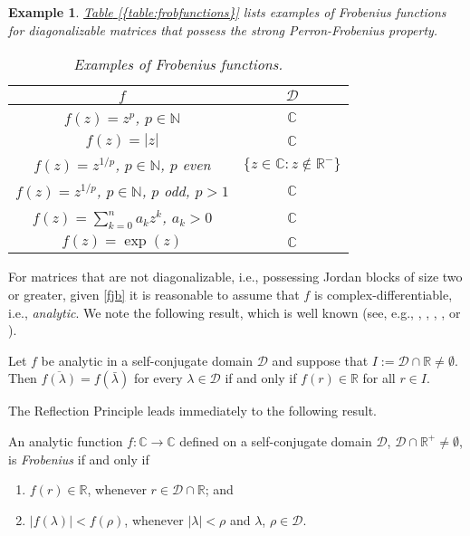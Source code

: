 \documentclass[10pt,twoside,leqno]{siamltex}
\newtheorem{ex}[theorem]{Example}
\begin{document}
\begin{ex}
{\rm {\hyperref[{table:frobfunctions}]{{\rm {Table} \ref*{{table:frobfunctions}}}}} lists examples of Frobenius functions for diagonalizable matrices that possess the strong Perron-Frobenius property. 
\begin{table}[H]
\begin{center}
\begin{tabular}{c|c}
$f$ & $\mathcal{D}$										\\
\hline
$f(z) = z^p$, $p \in {\mathbb{{N}}}$ & ${\mathbb{{C}}}$ 							\\
$f(z) = |z|$ & ${\mathbb{{C}}}$										\\
$f(z) = z^{1/p}$, $p \in {\mathbb{{N}}}$, $p$ even & $\{z \in {\mathbb{{C}}}: z \not \in {\mathbb{{R}}}^- \}$  \\
$f(z) = z^{1/p}$, $p \in {\mathbb{{N}}}$, $p$ odd, $p>1$ & ${\mathbb{{C}}}$  				\\
$f(z) = \sum_{k=0}^n a_k z^k$, $a_k >0$ & ${\mathbb{{C}}}$					\\
$f(z) = \exp{(z)}$ & ${\mathbb{{C}}}$
\end{tabular}
\caption{Examples of Frobenius functions.} \label{table:frobfunctions}
\end{center}
\end{table}}
\end{ex}

For matrices that are not diagonalizable, i.e., possessing Jordan blocks of size two or greater, given \eqref{fjb} it is reasonable to assume that $f$ is complex-differentiable, i.e., \textit{analytic}. We note the following result, which is well known (see, e.g., \cite{bc2013}, \cite{c1995}, \cite[Theorem 3.2]{hmmt2005}, \cite{l1999}, or \cite{r1987}).

\begin{theorem} \label{thm:refprinc}
Let $f$ be analytic in a self-conjugate domain $\mathcal{D}$ and suppose that $I := \mathcal{D} \cap {\mathbb{{R}}} \neq \emptyset$. Then $\overline{f(\lambda)} = f( \bar{\lambda})$ for every $\lambda \in \mathcal{D}$ if and only if $f(r) \in {\mathbb{{R}}}$ for all $r \in I$.
\end{theorem}

The Reflection Principle leads immediately to the following result.

\begin{corollary}
An analytic function $f: {\mathbb{{C}}} \longrightarrow {\mathbb{{C}}}$ defined on a self-conjugate domain $\mathcal{D}$, $\mathcal{D} \cap {\mathbb{{R}}}^+ \neq \emptyset$, is \textit{Frobenius} if and only if
\begin{enumerate}[label=(\roman*)]   
\item \label{item:real2} $f(r) \in {\mathbb{{R}}}$, whenever $r \in \mathcal{D} \cap {\mathbb{{R}}}$; and
\item \label{item:modulus2} $|f(\lambda)| < f(\rho)$, whenever $|\lambda|<\rho$ and $\lambda$, $\rho \in \mathcal{D}$.
\end{enumerate}
\end{corollary}
\end{document}
